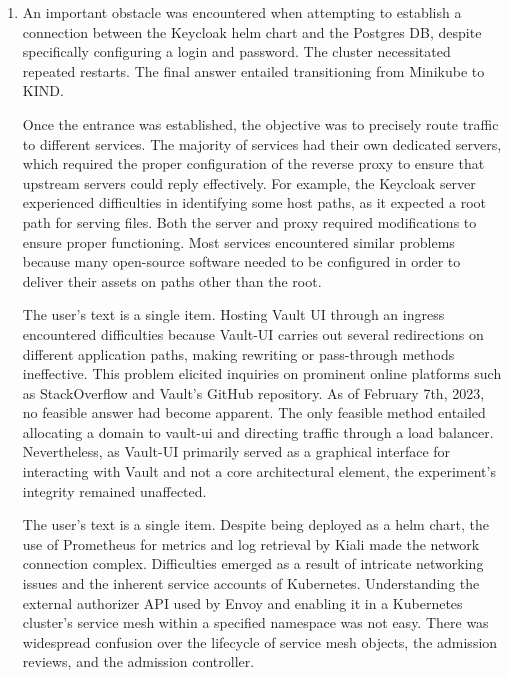 \documentclass[preprint,12pt]{elsarticle}
\begin{document}
\begin{enumerate} [label=({\alph*}) , leftmargin=30px]

  \item An important obstacle was encountered when attempting to establish a connection between the Keycloak helm chart and the Postgres DB, despite specifically configuring a login and password. The cluster necessitated repeated restarts. The final answer entailed transitioning from Minikube to KIND.

     Once the entrance was established, the objective was to precisely route traffic to different services. The majority of services had their own dedicated servers, which required the proper configuration of the reverse proxy to ensure that upstream servers could reply effectively. For example, the Keycloak server experienced difficulties in identifying some host paths, as it expected a root path for serving files. Both the server and proxy required modifications to ensure proper functioning. Most services encountered similar problems because many open-source software needed to be configured in order to deliver their assets on paths other than the root.

    The user's text is a single item. Hosting Vault UI through an ingress encountered difficulties because Vault-UI carries out several redirections on different application paths, making rewriting or pass-through methods ineffective. This problem elicited inquiries on prominent online platforms such as StackOverflow and Vault's GitHub repository. As of February 7th, 2023, no feasible answer had become apparent. The only feasible method entailed allocating a domain to vault-ui and directing traffic through a load balancer. Nevertheless, as Vault-UI primarily served as a graphical interface for interacting with Vault and not a core architectural element, the experiment's integrity remained unaffected.

    The user's text is a single item. Despite being deployed as a helm chart, the use of Prometheus for metrics and log retrieval by Kiali made the network connection complex. Difficulties emerged as a result of intricate networking issues and the inherent service accounts of Kubernetes. Understanding the external authorizer API used by Envoy and enabling it in a Kubernetes cluster's service mesh within a specified namespace was not easy. There was widespread confusion over the lifecycle of service mesh objects, the admission reviews, and the admission controller.

\end{enumerate}
\end{document}
